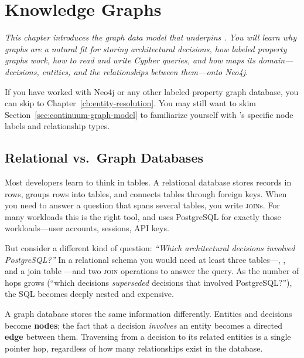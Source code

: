 \chapter{Knowledge Graphs}
\label{ch:knowledge-graphs}

\textit{This chapter introduces the graph data model that underpins \sysname{}.
You will learn why graphs are a natural fit for storing architectural decisions,
how labeled property graphs work, how to read and write Cypher queries, and how
\sysname{} maps its domain---decisions, entities, and the relationships between
them---onto Neo4j.}

\begin{skipahead}
If you have worked with Neo4j or any other labeled property graph database,
you can skip to Chapter~\ref{ch:entity-resolution}. You may still want to skim
Section~\ref{sec:continuum-graph-model} to familiarize yourself with
\sysname{}'s specific node labels and relationship types.
\end{skipahead}

\section{Relational vs.\ Graph Databases}
\label{sec:relational-vs-graph}

Most developers learn to think in tables. A relational database stores records
in rows, groups rows into tables, and connects tables through foreign keys.
When you need to answer a question that spans several tables, you write
\textsc{join}s. For many workloads this is the right tool, and \sysname{} uses
PostgreSQL for exactly those workloads---user accounts, sessions, API keys.

But consider a different kind of question: \emph{``Which architectural decisions
involved PostgreSQL?''} In a relational schema you would need at least three
tables---, , and a join table
---and two \textsc{join} operations to answer the query.
As the number of hops grows (``which decisions \emph{superseded} decisions that
involved PostgreSQL?''), the SQL becomes deeply nested and expensive.

A graph database stores the same information differently. Entities and
decisions become \textbf{nodes}; the fact that a decision \emph{involves} an
entity becomes a directed \textbf{edge} between them. Traversing from a
decision to its related entities is a single pointer hop, regardless of how
many relationships exist in the database.

